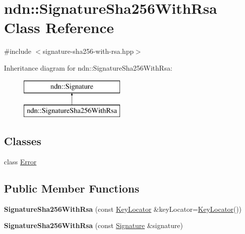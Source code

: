 \hypertarget{classndn_1_1SignatureSha256WithRsa}{}\section{ndn\+:\+:Signature\+Sha256\+With\+Rsa Class Reference}
\label{classndn_1_1SignatureSha256WithRsa}


{\ttfamily \#include $<$signature-\/sha256-\/with-\/rsa.\+hpp$>$}

Inheritance diagram for ndn\+:\+:Signature\+Sha256\+With\+Rsa\+:\begin{figure}[H]
\begin{center}
\leavevmode
\includegraphics[height=2.000000cm]{classndn_1_1SignatureSha256WithRsa}
\end{center}
\end{figure}
\subsection*{Classes}
\begin{DoxyCompactItemize}
\item 
class \hyperlink{classndn_1_1SignatureSha256WithRsa_1_1Error}{Error}
\end{DoxyCompactItemize}
\subsection*{Public Member Functions}
\begin{DoxyCompactItemize}
\item 
{\bfseries Signature\+Sha256\+With\+Rsa} (const \hyperlink{classndn_1_1KeyLocator}{Key\+Locator} \&key\+Locator=\hyperlink{classndn_1_1KeyLocator}{Key\+Locator}())\hypertarget{classndn_1_1SignatureSha256WithRsa_aeccd8c5734d819bd1acbdd47b2329b81}{}\label{classndn_1_1SignatureSha256WithRsa_aeccd8c5734d819bd1acbdd47b2329b81}

\item 
{\bfseries Signature\+Sha256\+With\+Rsa} (const \hyperlink{classndn_1_1Signature}{Signature} \&signature)\hypertarget{classndn_1_1SignatureSha256WithRsa_a3683351e93db82b2d57a6668161fa4d7}{}\label{classndn_1_1SignatureSha256WithRsa_a3683351e93db82b2d57a6668161fa4d7}

\end{DoxyCompactItemize}
